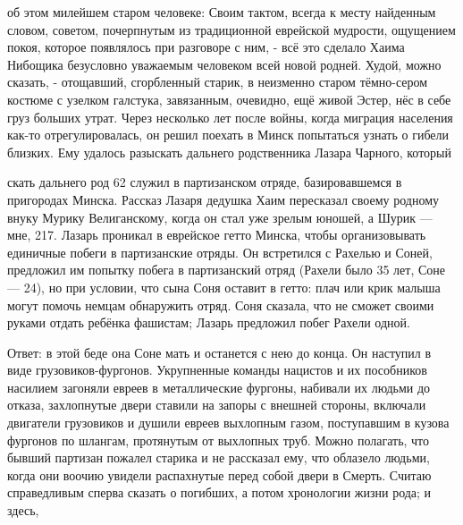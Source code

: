 об этом милейшем старом человеке: Своим тактом, всегда к месту найденным словом, советом, почерпнутым из традиционной еврейской мудрости, ощущением покоя, которое появлялось при разговоре с ним, - всё это сделало Хаима Нибощика безусловно уважаемым человеком всей новой родней. Худой, можно сказать, - отощавший, сгорбленный старик, в неизменно старом тёмно-сером костюме с узелком галстука, завязанным, очевидно, ещё живой Эстер, нёс в себе груз больших утрат. Через несколько лет после войны, когда миграция населения как-то отрегулировалась, он решил поехать в Минск попытаться узнать о гибели близких. Ему удалось разыскать дальнего родственника Лазара Чарного, который

скать дальнего род 62 служил в партизанском отряде, базировавшемся в пригородах Минска. Рассказ Лазаря дедушка Хаим пересказал своему родному внуку Мурику Велиганскому, когда он стал уже зрелым юношей, а Шурик — мне, 217. Лазарь проникал в еврейское гетто Минска, чтобы организовывать единичные побеги в партизанские отряды. Он встретился с Рахелью и Соней, предложил им попытку побега в партизанский отряд (Рахели было 35 лет, Соне — 24), но при условии, что сына Соня оставит в гетто: плач или крик малыша могут помочь немцам обнаружить отряд. Соня сказала, что не сможет своими руками отдать ребёнка фашистам; Лазарь предложил побег Рахели одной.

Ответ: в этой беде она Соне мать и останется с нею до конца. Он наступил в виде грузовиков-фургонов. Укрупненные команды нацистов и их пособников насилием загоняли евреев в металлические фургоны, набивали их людьми до отказа, захлопнутые двери ставили на запоры с внешней стороны, включали двигатели грузовиков и душили евреев выхлопным газом, поступавшим в кузова фургонов по шлангам, протянутым от выхлопных труб. Можно полагать, что бывший партизан пожалел старика и не рассказал ему, что облазело людьми, когда они воочию увидели распахнутые перед собой двери в Смерть. Считаю справедливым сперва сказать о погибших, а потом хронологии жизни рода; и здесь,

